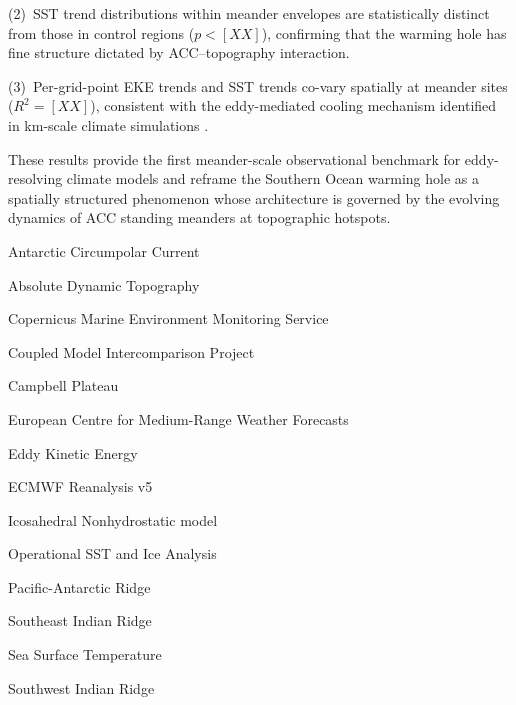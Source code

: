 \documentclass[draft]{agujournal2019}
\begin{document}
(2)~SST trend distributions within meander envelopes are statistically distinct from those in control regions ($p < [XX]$), confirming that the warming hole has fine structure dictated by ACC--topography interaction.

(3)~Per-grid-point EKE trends and SST trends co-vary spatially at meander sites ($R^{2} = [XX]$), consistent with the eddy-mediated cooling mechanism identified in km-scale climate simulations \cite{kang2026km}.

These results provide the first meander-scale observational benchmark for eddy-resolving climate models and reframe the Southern Ocean warming hole as a spatially structured phenomenon whose architecture is governed by the evolving dynamics of ACC standing meanders at topographic hotspots.







\begin{acronyms}

Antarctic Circumpolar Current

Absolute Dynamic Topography

Copernicus Marine Environment Monitoring Service

Coupled Model Intercomparison Project

Campbell Plateau

European Centre for Medium-Range Weather Forecasts

Eddy Kinetic Energy

ECMWF Reanalysis v5

Icosahedral Nonhydrostatic model

Operational SST and Ice Analysis

Pacific-Antarctic Ridge

Southeast Indian Ridge

Sea Surface Temperature

Southwest Indian Ridge

\end{acronyms}
\end{document}
